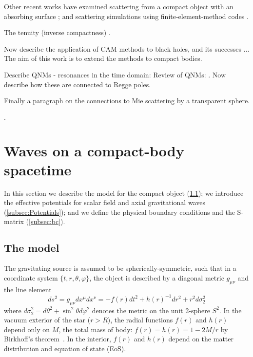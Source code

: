 \documentclass[aps,prd,longbibliography,reprint,twocolumn,amsmath,amssymb,amsfonts,showpacs,superscriptaddress]{revtex4-1}%
\begin{document}
Other recent works have examined scattering from a compact object with an absorbing surface \cite{Nambu:2019sqn}; and scattering simulations using finite-element-method codes \cite{He:2019orl}.  

The tenuity (inverse compactness) . 

Now describe the application of CAM methods to black holes, and its successes ... The aim of this work is to extend the methods to compact bodies.

Describe QNMs - resonances in the time domain: \cite{Detweiler:1985zz, Kokkotas:1986gd, Chandrasekhar449, Kokkotas:1992ka, Leins:1993zz, Andersson:1995ez, Andersson1996} Review of QNMs: \cite{Kokkotas:1999bd}. Now describe how these are connected to Regge poles.

Finally a paragraph on the connections to Mie scattering by a transparent sphere.

\cite{Leite:2017zyb,Nambu:2019sqn, Folacci:2019vtt,}.





\section{Waves on a compact-body spacetime}
\label{SecII}


In this section we describe the model for the compact object (\ref{SecIIa}); we introduce the effective potentials for scalar field and axial gravitational waves (\ref{subsec:Potentials}); and we define the physical boundary conditions and the S-matrix (\ref{subsec:bc}).


\subsection{The model}
\label{SecIIa}

The gravitating source is assumed to be spherically-symmetric, such that in a coordinate system $\{t,r,\theta,\varphi\}$, the object is described by a diagonal metric $g_{\mu \nu}$ and the line element
\begin{equation}\label{Line_elem}
 ds^2 = g_{\mu \nu} dx^\mu dx^\nu = -f(r) dt^2+h(r)^{-1}dr^2+r^2d\sigma_2^2
\end{equation}
where $d\sigma_2^2 = d\theta^2 + \sin^2 \theta d\varphi^2$ denotes the metric on the unit 2-sphere $S^2$. In the vacuum exterior of the star ($r>R$), the radial functions $f(r)$ and $h(r)$ depend only on $M$, the total mass of body: $f(r)=h(r)=1-2M/r$ by Birkhoff's theorem~\cite{VojeJohansen:2005nd}. In the interior, $f(r)$ and $h(r)$ depend on the matter distribution and equation of state (EoS).
\end{document}
